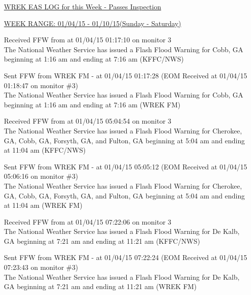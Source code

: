 \documentclass{article}
\begin{document}
\noindent \underline{\underline{WREK EAS LOG for this Week - Passes Inspection}} 

\medskip

\noindent \underline{WEEK RANGE: 01/04/15 - 01/10/15(Sunday - Saturday)}

\medskip

\hspace{20 pt}     Received FFW from  at 01/04/15 01:17:10 on monitor 3\\      The National Weather Service has issued a Flash Flood Warning for Cobb, GA beginning at 1:16 am and ending at 7:16 am (KFFC/NWS) 

\medskip

\hspace{20 pt}     Sent FFW from WREK FM - at 01/04/15 01:17:28 (EOM Received at 01/04/15 01:18:47 on monitor \#3) \\      The National Weather Service has issued a Flash Flood Warning for Cobb, GA beginning at 1:16 am and ending at 7:16 am (WREK FM) 

\medskip

\hspace{20 pt}     Received FFW from  at 01/04/15 05:04:54 on monitor 3\\      The National Weather Service has issued a Flash Flood Warning for Cherokee, GA, Cobb, GA, Forsyth, GA, and Fulton, GA beginning at 5:04 am and ending at 11:04 am (KFFC/NWS) 

\medskip

\hspace{20 pt}     Sent FFW from WREK FM - at 01/04/15 05:05:12 (EOM Received at 01/04/15 05:06:16 on monitor \#3) \\      The National Weather Service has issued a Flash Flood Warning for Cherokee, GA, Cobb, GA, Forsyth, GA, and Fulton, GA beginning at 5:04 am and ending at 11:04 am (WREK FM) 

\medskip

\hspace{20 pt}     Received FFW from  at 01/04/15 07:22:06 on monitor 3\\      The National Weather Service has issued a Flash Flood Warning for De Kalb, GA beginning at 7:21 am and ending at 11:21 am (KFFC/NWS) 

\medskip

\hspace{20 pt}     Sent FFW from WREK FM - at 01/04/15 07:22:24 (EOM Received at 01/04/15 07:23:43 on monitor \#3) \\      The National Weather Service has issued a Flash Flood Warning for De Kalb, GA beginning at 7:21 am and ending at 11:21 am (WREK FM) 
\end{document}
